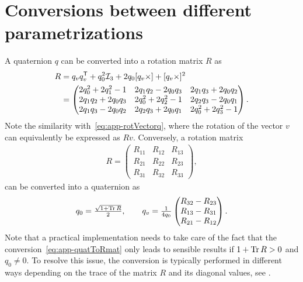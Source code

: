 \section{Conversions between different parametrizations}
\label{sec:app-rotation-conv}
A quaternion $q$ can be converted into a rotation matrix $R$ as
\begin{align}
R &= q_v q_v^{\mathsf{T}}  + q_0^2 \mathcal{I}_3 + 2 q_0 [q_v \times]  + [q_v \times ]^2 \nonumber \\
&= \begin{pmatrix} 2 q_0^2 + 2 q_1^2 - 1 & 2 q_1 q_2 - 2 q_0 q_3 & 2 q_1 q_3 + 2 q_0 q_2 \\ 2 q_1 q_2 + 2 q_0 q_3 & 2 q_0^2 + 2 q_2^2 - 1 & 2 q_2 q_3 - 2 q_0 q_1 \\ 2 q_1 q_3 - 2 q_0 q_2 & 2 q_2 q_3 + 2 q_0 q_1 & 2 q_0^2 + 2 q_3^2 -1 \end{pmatrix}.
\label{eq:app-defRq}
\end{align}
Note the similarity with~\eqref{eq:app-rotVectorq}, where the rotation of the vector $v$ can equivalently be expressed as $Rv$. Conversely, a rotation matrix
\begin{align}
R = \begin{pmatrix}
R_{11} & R_{12} & R_{13} \\
R_{21} & R_{22} & R_{23} \\
R_{31} & R_{32} & R_{33} 
\end{pmatrix},
\end{align}
can be converted into a quaternion as
\begin{align}
q_0 = \tfrac{\sqrt{1 + \operatorname{Tr}{R}}}{2}, \qquad q_v = \tfrac{1}{4 q_0} \begin{pmatrix} 
R_{32} - R_{23} \\
        R_{13} - R_{31} \\
        R_{21} - R_{12}
\end{pmatrix}. 
\label{eq:app-quatToRmat}
\end{align}
Note that a practical implementation needs to take care of the fact that the conversion~\eqref{eq:app-quatToRmat} only leads to sensible results if $1 + \operatorname{Tr}{R} > 0$ and $q_0 \neq 0$. To resolve this issue, the conversion is typically performed in different ways depending on the trace of the matrix $R$ and its diagonal values, see \eg\cite{euclideanSpace}. 

